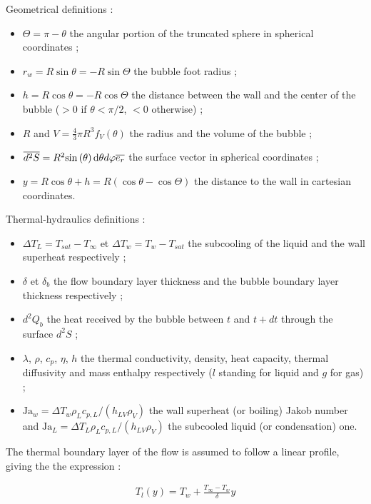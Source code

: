 \npar
Geometrical definitions :
\begin{itemize}
\item $\Theta=\pi - \theta$ the angular portion of the truncated sphere in spherical coordinates ;
\item $r_{w}=R\sin{\theta}=-R\sin{\Theta}$ the bubble foot radius ;
\item $h=R\cos{\theta}=-R\cos{\Theta}$ the distance between the wall and the center of the bubble ($>0$ if $\theta < \pi/2$, $<0$ otherwise) ;
\item $R$ and $V=\frac{4}{3}\pi R^{3} f_{V}\left(\theta\right)$ the radius and the volume of the bubble ;
\item $\overline{d^{2}S}=R^{2}\mathrm{sin}\left( \theta \right)\mathrm{d}\theta d\varphi \overline{e_{r}}$ the surface vector in spherical coordinates ;
\item $y=R\cos{\theta}+h = R\left(\cos{\theta} - \cos{\Theta}\right)$ the distance to the wall in cartesian coordinates.
\end{itemize}


\npar
Thermal-hydraulics definitions :
\begin{itemize}
\item $\Delta T_{L} = T_{sat}-T_{\infty}$ et $\Delta T_{w}=T_{w}-T_{sat}$ the subcooling of the liquid and the wall superheat respectively ;
\item $\delta$ et $\delta_{b}$ the flow boundary layer thickness and the bubble boundary layer thickness respectively ;
\item $d^{2} Q_{b}$ the heat received by the bubble between $t$ and $t+dt$ through the surface $d^{2}S$ ;
\item $\lambda$, $\rho$, $c_{p}$, $\eta$, $h$ the thermal conductivity, density, heat capacity, thermal diffusivity and mass enthalpy respectively ($l$ standing for liquid  and $g$ for gas) ;
\item $\text{Ja}_{w}=\Delta T_{w} \rho_{L}c_{p,L}/(h_{LV}\rho_{V})$ the wall superheat (or boiling) Jakob number and $\text{Ja}_{L}=\Delta T_{L} \rho_{L}c_{p,L}/(h_{LV}\rho_{V})$ the subcooled liquid (or condensation) one.
\end{itemize}

\npar


The thermal boundary layer of the flow is assumed to follow a linear profile, giving the the expression :

\begin{align}
T_{l}\left(y\right)=T_{w}+\frac{T_{\infty}-T_{w}}{\delta} y
\end{align}


